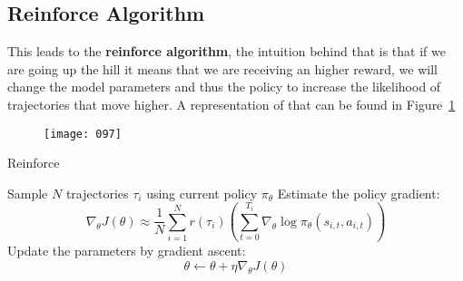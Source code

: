 \subsection{Reinforce Algorithm}
This leads to the \textbf{reinforce algorithm}, the intuition behind that is that if we are going up the hill it means that we are receiving an higher reward, we will change the model parameters and thus the policy to increase the likelihood of trajectories that move higher. A representation of that can be found in Figure~\ref{fig:097}
\begin{figure}[t!]
    \centering
    \texttt{[image: 097]}
    \caption{}
    \label{fig:097}
\end{figure}

\begin{algorithm}
    \caption{Reinforce}
    \label{alg:reinforce}
    
    Sample \(N\) trajectories \(\tau_i\) using current policy \(\pi_\theta\)\;
    Estimate the policy gradient:
    \begin{equation}
        \nabla_\theta J (\theta) \approx \frac 1 N \sum_{i=1}^N r (\tau_i) \left(
            \sum_{t=0}^{T_i} \nabla_\theta \log \pi_\theta (s_{i,t}, a_{i,t})
        \right)
    \end{equation}
    Update the parameters by gradient ascent:
    \begin{equation}
        \theta \gets \theta + \eta \nabla_\theta J(\theta)
    \end{equation}

\end{algorithm}
